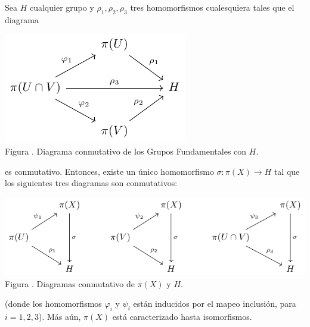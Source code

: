 \documentclass[12pt]{report}
\theoremstyle{largebreak}
\newcommand\cf[3]{\ensuremath{#1:#2\rightarrow#3}}
\newcounter{figcount}
\begin{document}
    \begin{theor}
        Sea $H$ cualquier grupo y $\rho_1,\rho_2,\rho_3$ tres homomorfismos cualesquiera tales que el diagrama

        \begin{minipage}{\textwidth}
            \begin{center}
                \includegraphics[scale=1.5]{images/fig_1.pdf}\\
                Figura \thefigcount. Diagrama conmutativo de los Grupos Fundamentales con $H$.
            \end{center}
        \end{minipage}

        es conmutativo. Entonces, existe un único homomorfismo $\cf{\sigma}{\pi(X)}{H}$ tal que los siguientes tres diagramas son conmutativos:

        \begin{minipage}{\textwidth}
            \begin{center}
                \includegraphics[scale=1.5]{images/fig_2.pdf}\\
                Figura \thefigcount. Diagramas conmutativo de $\pi(X)$ y $H$.
            \end{center}
        \end{minipage}

        (donde los homomorfismos $\varphi_i$ y $\psi_i$ están inducidos por el mapeo inclusión, para $i=1,2,3$). Más aún, $\pi(X)$ está caracterizado hasta isomorfismos.
    \end{theor}
\end{document}
